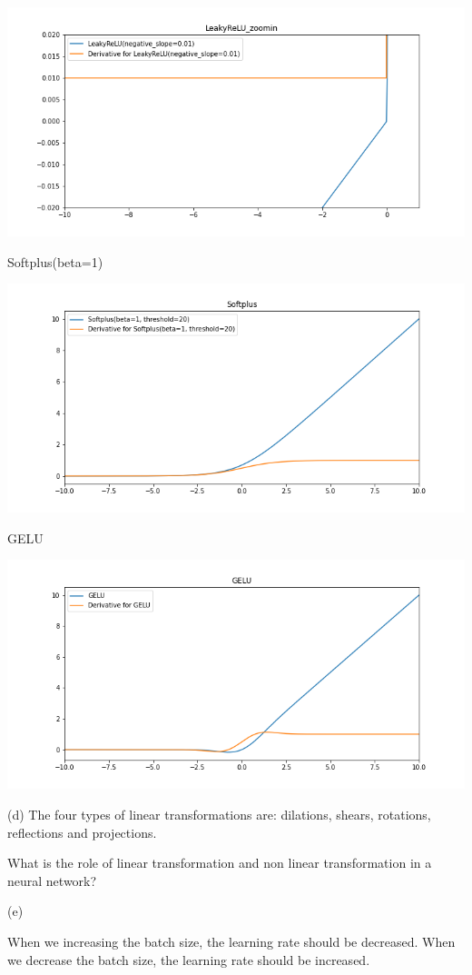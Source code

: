 \includegraphics[width=\linewidth]{./imgs/leakyrelu_zoomin.png}

Softplus(beta=1)

\includegraphics[width=\linewidth]{./imgs/softplus.png}





GELU

\includegraphics[width=\linewidth]{./imgs/GELU.png}




(d)
The four types of linear transformations are: dilations, shears, rotations, reflections and projections.

What is the role of linear transformation and non linear transformation in a neural network?

(e)

When we increasing the batch size, the learning rate should be decreased.
When we decrease the batch size, the learning rate should be increased.

